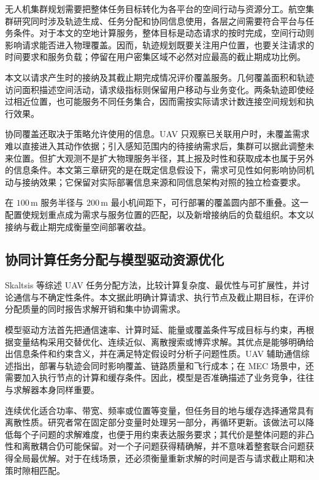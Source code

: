 无人机集群规划需要把整体任务目标转化为各平台的空间行动与资源分工。航空集群研究同时涉及轨迹生成、任务分配和协同信息使用，各层之间需要符合平台与任务条件\cite{chung2018swarm}。对于本文的空地计算服务，整体目标是动态请求的按时完成，空间行动则影响请求能否进入物理覆盖。因而，轨迹规划既要关注用户位置，也要关注请求的时间要求和服务负载；停留在用户密集区域不必然对应最高的截止期成功比例。

本文以请求产生时的接纳及其截止期完成情况评价覆盖服务。几何覆盖面积和轨迹访问面积描述空间活动，请求级指标则保留用户移动与业务变化。两条轨迹即使经过相近位置，也可能服务不同任务集合，因而需按实际请求计数连接空间规划和执行效果。

协同覆盖还取决于策略允许使用的信息。UAV 只观察已关联用户时，未覆盖需求难以直接进入其动作依据；引入感知范围内的待接纳需求后，集群可以据此调整未来位置。但扩大观测不是扩大物理服务半径，其上报及时性和获取成本也属于另外的信息条件。本文第三章研究的是在既定信息假设下，需求可见性如何影响协同机动与接纳效果；它保留对实际部署信息来源和同信息架构对照的独立检查要求。

在 $100\,\mathrm{m}$ 服务半径与 $200\,\mathrm{m}$ 最小机间距下，可行部署的覆盖圆内部不重叠。这一配置使规划重点成为需求与服务位置的匹配，以及新增接纳后的负载组织。本文以接纳与截止期完成衡量空间部署收益。

\subsection{协同计算任务分配与模型驱动资源优化}
\label{sec:ch1-model-based}

Skaltsis 等综述 UAV 任务分配方法，比较计算复杂度、最优性与可扩展性，并讨论通信与不确定性条件\cite{skaltsis2023allocation}。本文据此明确计算请求、执行节点及截止期目标，在评价分配质量的同时报告求解开销和集中协调需求。

模型驱动方法首先把通信速率、计算时延、能量或覆盖条件写成目标与约束，再根据变量结构采用交替优化、连续近似、离散搜索或博弈求解。其优点是能够明确给出信息条件和约束含义，并在满足特定假设时分析子问题性质。UAV 辅助通信综述指出，部署与轨迹会同时影响覆盖、链路质量和飞行成本\cite{zeng2016wireless,mozaffari2019tutorial}；在 MEC 场景中，还需要加入执行节点的计算和缓存条件。因此，模型是否准确描述了业务竞争，往往与求解器本身同样重要。

连续优化适合功率、带宽、频率或位置等变量，但任务目的地与缓存选择通常具有离散性质。研究者常在固定部分变量时处理另一部分，再循环更新。该做法可以降低每个子问题的求解难度，也便于用约束表达服务要求；其代价是整体问题的非凸性和离散耦合仍可能保留。对一个子问题获得精确解，并不意味着整套联合问题获得全局最优解。对于在线场景，还必须衡量重新求解的时间是否与请求截止期和决策时隙相匹配。

